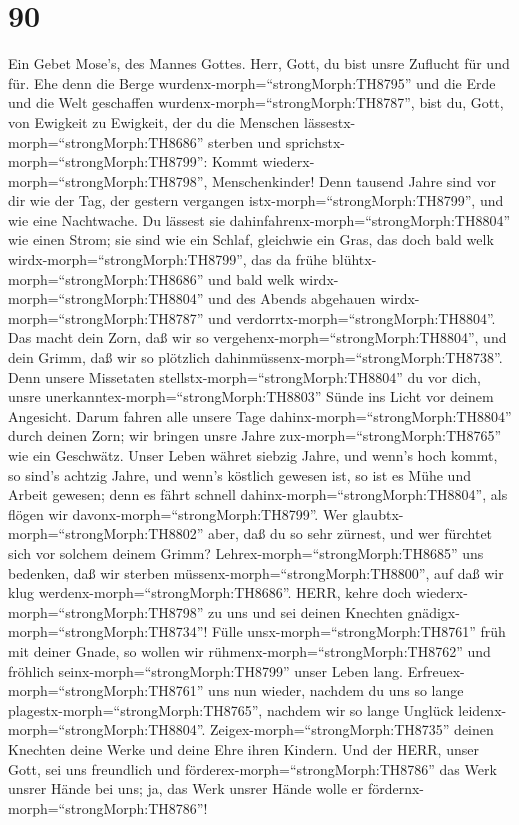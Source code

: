 \hypertarget{section-89}{%
\section{90}\label{section-89}}

 Ein Gebet Mose's, des Mannes Gottes. Herr, Gott, du bist
unsre Zuflucht für und für.  Ehe denn die Berge
wurdenx-morph=``strongMorph:TH8795'' und die Erde und die Welt
geschaffen wurdenx-morph=``strongMorph:TH8787'', bist du, Gott, von
Ewigkeit zu Ewigkeit,  der du die Menschen
lässestx-morph=``strongMorph:TH8686'' sterben und
sprichstx-morph=``strongMorph:TH8799'': Kommt
wiederx-morph=``strongMorph:TH8798'', Menschenkinder!  Denn
tausend Jahre sind vor dir wie der Tag, der gestern vergangen
istx-morph=``strongMorph:TH8799'', und wie eine Nachtwache. 
Du lässest sie dahinfahrenx-morph=``strongMorph:TH8804'' wie einen
Strom; sie sind wie ein Schlaf, gleichwie ein Gras, das doch bald welk
wirdx-morph=``strongMorph:TH8799'',  das da frühe
blühtx-morph=``strongMorph:TH8686'' und bald welk
wirdx-morph=``strongMorph:TH8804'' und des Abends abgehauen
wirdx-morph=``strongMorph:TH8787'' und
verdorrtx-morph=``strongMorph:TH8804''.  Das macht dein
Zorn, daß wir so vergehenx-morph=``strongMorph:TH8804'', und dein Grimm,
daß wir so plötzlich dahinmüssenx-morph=``strongMorph:TH8738''.
 Denn unsere Missetaten
stellstx-morph=``strongMorph:TH8804'' du vor dich, unsre
unerkanntex-morph=``strongMorph:TH8803'' Sünde ins Licht vor deinem
Angesicht.  Darum fahren alle unsere Tage
dahinx-morph=``strongMorph:TH8804'' durch deinen Zorn; wir bringen unsre
Jahre zux-morph=``strongMorph:TH8765'' wie ein Geschwätz. 
Unser Leben währet siebzig Jahre, und wenn's hoch kommt, so sind's
achtzig Jahre, und wenn's köstlich gewesen ist, so ist es Mühe und
Arbeit gewesen; denn es fährt schnell
dahinx-morph=``strongMorph:TH8804'', als flögen wir
davonx-morph=``strongMorph:TH8799''.  Wer
glaubtx-morph=``strongMorph:TH8802'' aber, daß du so sehr zürnest, und
wer fürchtet sich vor solchem deinem Grimm? 
Lehrex-morph=``strongMorph:TH8685'' uns bedenken, daß wir sterben
müssenx-morph=``strongMorph:TH8800'', auf daß wir klug
werdenx-morph=``strongMorph:TH8686''.  HERR, kehre doch
wiederx-morph=``strongMorph:TH8798'' zu uns und sei deinen Knechten
gnädigx-morph=``strongMorph:TH8734''!  Fülle
unsx-morph=``strongMorph:TH8761'' früh mit deiner Gnade, so wollen wir
rühmenx-morph=``strongMorph:TH8762'' und fröhlich
seinx-morph=``strongMorph:TH8799'' unser Leben lang. 
Erfreuex-morph=``strongMorph:TH8761'' uns nun wieder, nachdem du uns so
lange plagestx-morph=``strongMorph:TH8765'', nachdem wir so lange
Unglück leidenx-morph=``strongMorph:TH8804''. 
Zeigex-morph=``strongMorph:TH8735'' deinen Knechten deine Werke und
deine Ehre ihren Kindern.  Und der HERR, unser Gott, sei
uns freundlich und förderex-morph=``strongMorph:TH8786'' das Werk unsrer
Hände bei uns; ja, das Werk unsrer Hände wolle er
fördernx-morph=``strongMorph:TH8786''!

